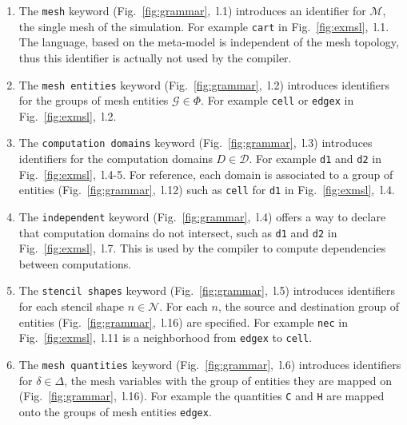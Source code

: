\begin{enumerate}

\item The \texttt{mesh} keyword (Fig.~\ref{fig:grammar},~l.1) introduces an identifier for $\mathcal{M}$, the single mesh of the simulation. For example \texttt{cart} in Fig.~\ref{fig:exmsl},~l.1. The language, based on the meta-model is independent of the mesh topology, thus this identifier is actually not used by the compiler.%

\item The \texttt{mesh entities} keyword (Fig.~\ref{fig:grammar},~l.2) introduces identifiers for the groups of mesh entities $\mathcal{G}\in\Phi$. For example \texttt{cell} or \texttt{edgex} in Fig.~\ref{fig:exmsl},~l.2. %

\item The \texttt{computation domains} keyword (Fig.~\ref{fig:grammar},~l.3) introduces identifiers for the computation domains $D\in\mathcal{D}$. For example \texttt{d1} and \texttt{d2} in Fig.~\ref{fig:exmsl},~l.4-5. For reference, each domain is associated to a group of entities (Fig.~\ref{fig:grammar},~l.12) such as \texttt{cell} for \texttt{d1} in Fig.~\ref{fig:exmsl},~l.4.

\item The \texttt{independent} keyword (Fig.~\ref{fig:grammar},~l.4) offers a way to declare that computation domains do not intersect, such as \texttt{d1} and \texttt{d2} in  Fig.~\ref{fig:exmsl},~l.7. This is used by the compiler to compute dependencies between computations.

\item The \texttt{stencil shapes} keyword (Fig.~\ref{fig:grammar},~l.5) introduces identifiers for each stencil shape $n\in\mathcal{N}$. For each $n$, the source and destination group of entities (Fig.~\ref{fig:grammar},~l.16) are specified. For example \texttt{nec} in Fig.~\ref{fig:exmsl},~l.11 is a neighborhood from \texttt{edgex} to \texttt{cell}.

\item The \texttt{mesh quantities} keyword (Fig.~\ref{fig:grammar},~l.6) introduces identifiers for $\delta\in\Delta$, the mesh variables with the group of entities they are mapped on (Fig.~\ref{fig:grammar},~l.16). For example the quantities \texttt{C} and \texttt{H} are mapped onto the groups of mesh entities \texttt{edgex}.


\end{enumerate}
